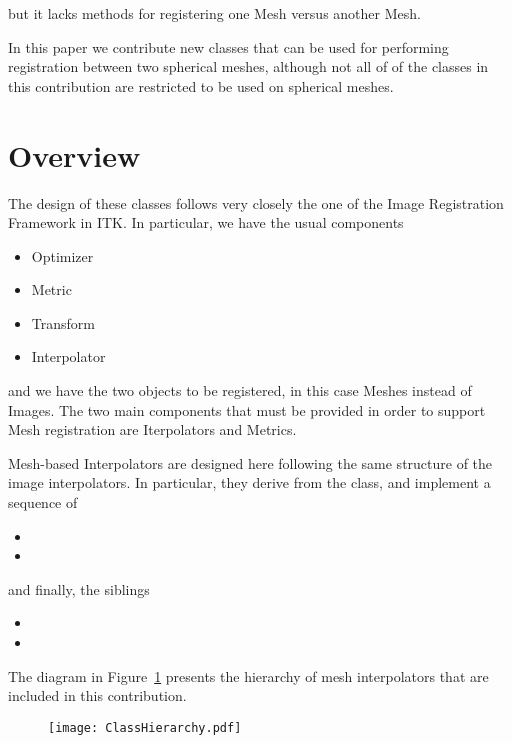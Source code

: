 \documentclass{InsightArticle}
\begin{document}
but it lacks methods for registering one Mesh versus another Mesh.

In this paper we contribute new classes that can be used for performing
registration between two spherical meshes, although not all of of the classes
in this contribution are restricted to be used on spherical meshes.

\section{Overview}

The design of these classes follows very closely the one of the Image
Registration Framework in ITK.  In particular, we have the usual components

\begin{itemize}
\item Optimizer
\item Metric
\item Transform
\item Interpolator
\end{itemize}

and we have the two objects to be registered, in this case Meshes instead of
Images. The two main components that must be provided in order to support Mesh
registration are Iterpolators and Metrics.

Mesh-based Interpolators are designed here following the same structure of the
image interpolators. In particular, they derive from the 
class, and implement a sequence of 

\begin{itemize}
\item {}
\item {}
\end{itemize}

 and finally, the siblings

\begin{itemize}
\item {}
\item {}
\end{itemize}

The diagram in Figure~\ref{fig:ClassHierarchy} presents the hierarchy of mesh
interpolators that are included in this contribution.

\begin{figure}
\center
\texttt{[image: ClassHierarchy.pdf]}
\label{fig:ClassHierarchy}
\end{figure}
\end{document}

